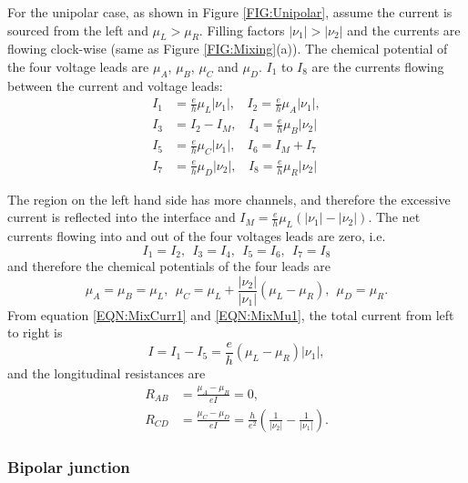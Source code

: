 \documentclass[pdflatex, sectionletters, 12pt, final, phd]{pittetd}    %
\begin{document}
For the unipolar case, as shown in Figure \ref{FIG:Unipolar}, assume the current is sourced from the left and $\mu_L > \mu_R$. Filling factors $|\nu_1| > |\nu_2|$ and the currents are flowing clock-wise (same as Figure \ref{FIG:Mixing}(a)). The chemical potential of the four voltage leads are $\mu_A$, $\mu_B$, $\mu_C$ and $\mu_D$. $I_1$ to $I_8$ are the currents flowing between the current and voltage leads:
\begin{equation}
\label{EQN:MixCurr1}
\begin{split}
I_1 & = \frac{e}{h}\mu_L|\nu_1|, \ \ \ \  I_2 = \frac{e}{h}\mu_A|\nu_1|, \\
I_3 & = I_2 - I_M, \ \ \ \ I_4 = \frac{e}{h}\mu_B|\nu_2| \\
I_5 & = \frac{e}{h}\mu_C|\nu_1|, \ \ \ \ I_6 = I_M + I_7 \\
I_7 & = \frac{e}{h}\mu_D|\nu_2|, \ \ \ \ I_8 = \frac{e}{h}\mu_R|\nu_2|
\end{split}
\end{equation}

The region on the left hand side has more channels, and therefore the excessive current is reflected into the interface and $I_M = \frac{e}{h}\mu_L(|\nu_1|-|\nu_2|)$. The net currents flowing into and out of the four voltages leads are zero, i.e.
$$
I_1 = I_2, \ \ I_3 = I_4, \ \ I_5 = I_6, \ \ I_7 = I_8
$$
and therefore the chemical potentials of the four leads are
\begin{equation}
\label{EQN:MixMu1}
\mu_A = \mu_B = \mu_L, \ \ \mu_C = \mu_L + \frac{|\nu_2|}{|\nu_1|}(\mu_L - \mu_R), \ \ \mu_D = \mu_R.
\end{equation}
From equation \ref{EQN:MixCurr1} and \ref{EQN:MixMu1}, the total current from left to right is 
$$
I = I_1 - I_5 = \frac{e}{h}(\mu_L - \mu_R)|\nu_1|,
$$ 
and the longitudinal resistances are 
\begin{equation}
\label{EQN:Mixing1}
\begin{split}
R_{AB} & = \frac{\mu_A - \mu_B}{eI} = 0, \\
R_{CD} & = \frac{\mu_C - \mu_D}{eI} = \frac{h}{e^2}\left(\frac{1}{|\nu_2|} - \frac{1}{|\nu_1|}\right).
\end{split}
\end{equation}

\subsubsection{Bipolar junction}
\end{document}

